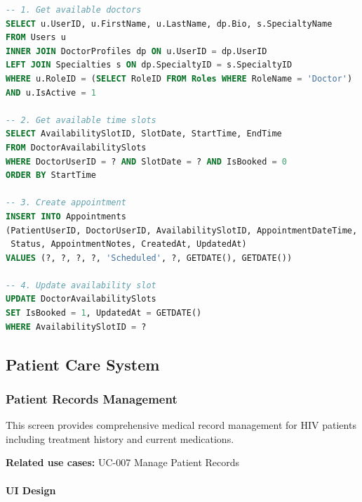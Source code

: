 \documentclass[12pt,a4paper]{article}
\begin{document}
\begin{lstlisting}[language=SQL]
-- 1. Get available doctors
SELECT u.UserID, u.FirstName, u.LastName, dp.Bio, s.SpecialtyName
FROM Users u
INNER JOIN DoctorProfiles dp ON u.UserID = dp.UserID
LEFT JOIN Specialties s ON dp.SpecialtyID = s.SpecialtyID
WHERE u.RoleID = (SELECT RoleID FROM Roles WHERE RoleName = 'Doctor')
AND u.IsActive = 1

-- 2. Get available time slots
SELECT AvailabilitySlotID, SlotDate, StartTime, EndTime
FROM DoctorAvailabilitySlots
WHERE DoctorUserID = ? AND SlotDate = ? AND IsBooked = 0
ORDER BY StartTime

-- 3. Create appointment
INSERT INTO Appointments 
(PatientUserID, DoctorUserID, AvailabilitySlotID, AppointmentDateTime, 
 Status, AppointmentNotes, CreatedAt, UpdatedAt)
VALUES (?, ?, ?, ?, 'Scheduled', ?, GETDATE(), GETDATE())

-- 4. Update availability slot
UPDATE DoctorAvailabilitySlots 
SET IsBooked = 1, UpdatedAt = GETDATE()
WHERE AvailabilitySlotID = ?
\end{lstlisting}

\subsection{Patient Care System}

\subsubsection{Patient Records Management}

This screen provides comprehensive medical record management for HIV patients including treatment history and current medications.

\textbf{Related use cases:} UC-007 Manage Patient Records

\paragraph{UI Design}
\end{document}
